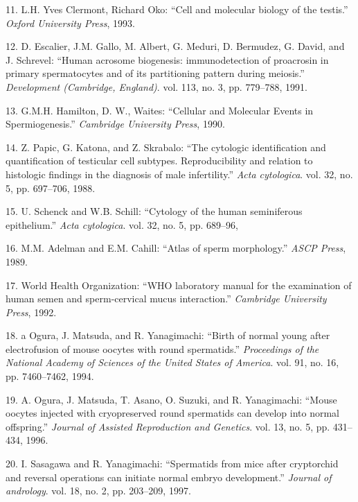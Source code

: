 \documentclass[12pt,a4paper,twoside]{ugathesis}
\theoremstyle{definition}
\theoremstyle{definition}
\theoremstyle{definition}
\theoremstyle{remark}
\begin{document}
\hypertarget{ref-YvesClermontRichardOko1993}{}
11. L.H. Yves Clermont, Richard Oko: ``Cell and molecular biology of the
testis.'' \emph{Oxford University Press}, 1993.

\hypertarget{ref-Escalier1991}{}
12. D. Escalier, J.M. Gallo, M. Albert, G. Meduri, D. Bermudez, G.
David, and J. Schrevel: ``Human acrosome biogenesis: immunodetection of
proacrosin in primary spermatocytes and of its partitioning pattern
during meiosis.'' \emph{Development (Cambridge, England)}. vol. 113, no.
3, pp. 779--788, 1991.

\hypertarget{ref-Hamilton1987}{}
13. G.M.H. Hamilton, D. W., Waites: ``Cellular and Molecular Events in
Spermiogenesis.'' \emph{Cambridge University Press}, 1990.

\hypertarget{ref-Papic}{}
14. Z. Papic, G. Katona, and Z. Skrabalo: ``The cytologic identification
and quantification of testicular cell subtypes. Reproducibility and
relation to histologic findings in the diagnosis of male infertility.''
\emph{Acta cytologica}. vol. 32, no. 5, pp. 697--706, 1988.

\hypertarget{ref-Schenck}{}
15. U. Schenck and W.B. Schill: ``Cytology of the human seminiferous
epithelium.'' \emph{Acta cytologica}. vol. 32, no. 5, pp. 689--96,

\hypertarget{ref-Adelman1989}{}
16. M.M. Adelman and E.M. Cahill: ``Atlas of sperm morphology.''
\emph{ASCP Press}, 1989.

\hypertarget{ref-WorldHealthOrganization1992}{}
17. World Health Organization: ``WHO laboratory manual for the
examination of human semen and sperm-cervical mucus interaction.''
\emph{Cambridge University Press}, 1992.

\hypertarget{ref-Ogura1994}{}
18. a Ogura, J. Matsuda, and R. Yanagimachi: ``Birth of normal young
after electrofusion of mouse oocytes with round spermatids.''
\emph{Proceedings of the National Academy of Sciences of the United
States of America}. vol. 91, no. 16, pp. 7460--7462, 1994.

\hypertarget{ref-Kimura1995}{}
19. A. Ogura, J. Matsuda, T. Asano, O. Suzuki, and R. Yanagimachi:
``Mouse oocytes injected with cryopreserved round spermatids can develop
into normal offspring.'' \emph{Journal of Assisted Reproduction and
Genetics}. vol. 13, no. 5, pp. 431--434, 1996.

\hypertarget{ref-Sasagawa}{}
20. I. Sasagawa and R. Yanagimachi: ``Spermatids from mice after
cryptorchid and reversal operations can initiate normal embryo
development.'' \emph{Journal of andrology}. vol. 18, no. 2, pp.
203--209, 1997.
\end{document}
